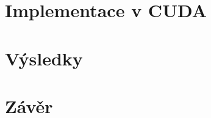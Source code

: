 \documentclass[11pt,a4paper]{report}
\theoremstyle{plain}
\begin{document}
        

    \chapter{Implementace v CUDA}

        

    \chapter{Výsledky}

    \chapter*{Závěr}


    

\end{document}
